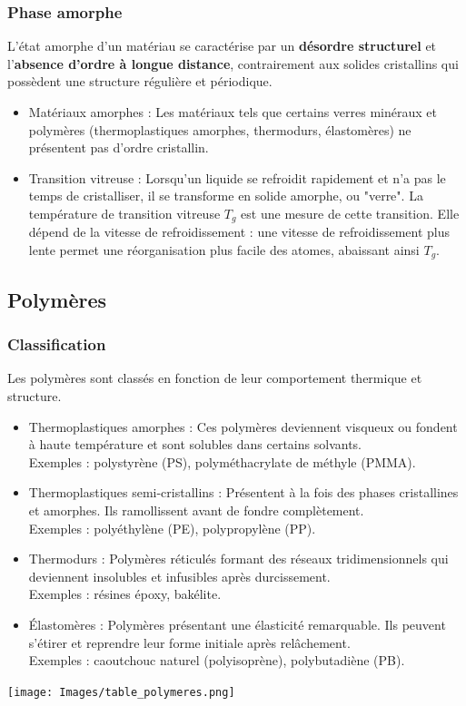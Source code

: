\documentclass{article}
\begin{document}
        \subsubsection{Phase amorphe}
        L'état amorphe d'un matériau se caractérise par un \textbf{désordre structurel} et l'\textbf{absence d'ordre à longue distance}, contrairement aux solides cristallins qui possèdent une structure régulière et périodique.
        \begin{itemize}
            \item Matériaux amorphes : Les matériaux tels que certains verres minéraux et polymères (thermoplastiques amorphes, thermodurs, élastomères) ne présentent pas d'ordre cristallin.
            \item Transition vitreuse : Lorsqu'un liquide se refroidit rapidement et n'a pas le temps de cristalliser, il se transforme en solide amorphe, ou "verre". La température de transition vitreuse $T_g$ est une mesure de cette transition. Elle dépend de la vitesse de refroidissement : une vitesse de refroidissement plus lente permet une réorganisation plus facile des atomes, abaissant ainsi $T_g$.
        \end{itemize}
    
    \subsection{Polymères}
        \subsubsection{Classification}
        Les polymères sont classés en fonction de leur comportement thermique et structure.
        
        \begin{itemize}
            \item Thermoplastiques amorphes : Ces polymères deviennent visqueux ou fondent à haute température et sont solubles dans certains solvants.\\ Exemples : polystyrène (PS), polyméthacrylate de méthyle (PMMA).
            \item Thermoplastiques semi-cristallins : Présentent à la fois des phases cristallines et amorphes. Ils ramollissent avant de fondre complètement.\\ Exemples : polyéthylène (PE), polypropylène (PP).
            \item Thermodurs : Polymères réticulés formant des réseaux tridimensionnels qui deviennent insolubles et infusibles après durcissement.\\ Exemples : résines époxy, bakélite.
            \item Élastomères : Polymères présentant une élasticité remarquable. Ils peuvent s'étirer et reprendre leur forme initiale après relâchement.\\ Exemples : caoutchouc naturel (polyisoprène), polybutadiène (PB).
        \end{itemize}
        \texttt{[image: Images/table\_polymeres.png]}
    
\end{document}
